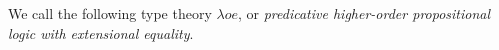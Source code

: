 We call the following type theory $\lambda o e$, or \emph{predicative higher-order propositional logic with extensional equality}.  



















